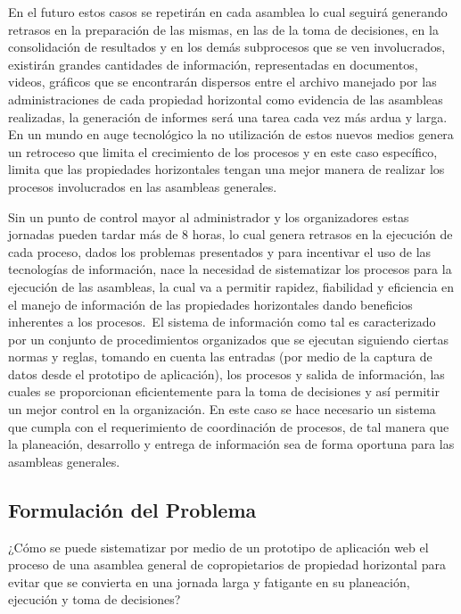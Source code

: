 En el futuro estos casos se repetirán en cada asamblea lo cual seguirá generando retrasos en la preparación de las mismas, en las de la toma de decisiones, en la consolidación de resultados y en los demás subprocesos que se ven involucrados, existirán grandes cantidades de información, representadas en documentos, videos, gráficos que se encontrarán dispersos entre el archivo manejado por las administraciones de cada propiedad horizontal como evidencia de las asambleas realizadas, la generación de informes será una tarea cada vez más ardua y larga. En un mundo en auge tecnológico la no utilización de estos nuevos medios genera un retroceso que limita el crecimiento de los procesos y en este caso específico, limita que las propiedades horizontales tengan una mejor manera de realizar los procesos involucrados en las asambleas generales.

Sin un punto de control mayor al administrador y los organizadores estas jornadas pueden tardar más de 8 horas, lo cual genera retrasos en la ejecución de cada proceso, dados los problemas presentados y para incentivar el uso de las tecnologías de información, nace la necesidad de sistematizar los procesos para la ejecución de las asambleas, la cual va a permitir rapidez, fiabilidad y eficiencia en el manejo de información de las propiedades horizontales dando beneficios inherentes a los procesos.\ 
El sistema de información como tal es caracterizado por un conjunto de procedimientos organizados que se ejecutan siguiendo ciertas normas y reglas, tomando en cuenta las entradas (por medio de la captura de datos desde el prototipo de aplicación), los procesos y salida de información, las cuales se proporcionan eficientemente para la toma de decisiones y así permitir un mejor control en la organización. En este caso se hace necesario un sistema que cumpla con el requerimiento de coordinación de procesos, de tal manera que la planeación, desarrollo y entrega de información sea de forma oportuna para las asambleas generales.

\subsection{Formulación del Problema}

¿Cómo se puede sistematizar por medio de un prototipo de aplicación web el proceso de una asamblea general de copropietarios de propiedad horizontal para evitar que se convierta en una jornada larga y fatigante en su planeación, ejecución y toma de decisiones?


